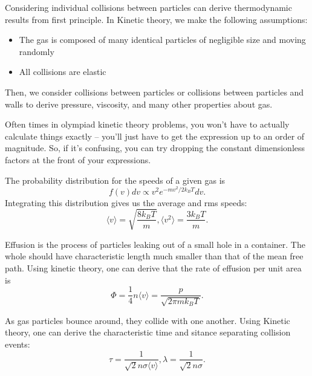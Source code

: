 \documentclass[11pt]{scrartcl}
\begin{document}
\begin{idea}
    Considering individual collisions between particles can derive thermodynamic results from first principle. In Kinetic theory, we make the following assumptions:
    \begin{itemize}
        \item The gas is composed of many identical particles of negligible size and moving randomly
        \item All collisions are elastic
    \end{itemize}
    Then, we consider collisions between particles or collisions between particles and walls to derive pressure, viscosity, and many other properties about gas.
\end{idea}

\begin{tip}[Estimating]
    Often times in olympiad kinetic theory problems, you won't have to actually calculate things exactly -- you'll just have to get the expression up to an order of magnitude. So, if it's confusing, you can try dropping the constant dimensionless factors at the front of your expressions.
\end{tip}

\begin{theorem}
    The probability distribution for the speeds of a given gas is
    $$f(v) dv \propto v^2 e^{-mv^2/2k_BT}dv.$$
    Integrating this distribution gives us the average and rms speeds:
    $$\langle v \rangle = \sqrt{\frac{8k_BT}{m}}, \langle v^2 \rangle = \frac{3k_BT}{m}.$$
\end{theorem}

\begin{idea}[Effusion]
    Effusion is the process of particles leaking out of a small hole in a container. The whole should have characteristic length much smaller than that of the mean free path. Using kinetic theory, one can derive that the rate of effusion per unit area is
    $$\Phi = \frac 14 n \langle v \rangle = \frac{p}{\sqrt{2\pi m k_B T}}.$$
\end{idea}

\begin{idea}
    As gas particles bounce around, they collide with one another. Using Kinetic theory, one can derive the characteristic time and sitance separating collision events:
    $$\tau = \frac{1}{\sqrt 2 n\sigma \langle v\rangle},\lambda = \frac{1}{\sqrt 2 n \sigma}.$$
\end{idea}
\end{document}
